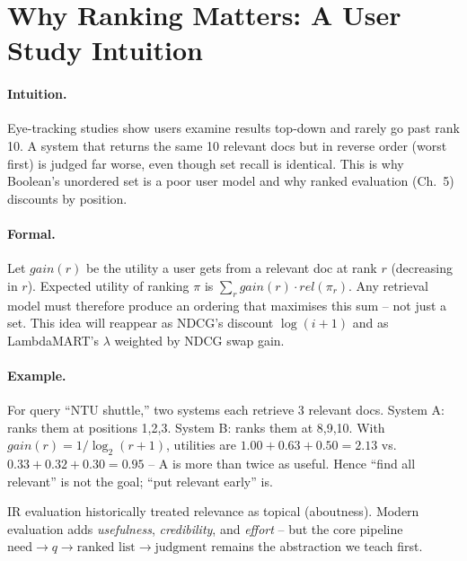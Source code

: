 
\section{Why Ranking Matters: A User Study Intuition}\label{sec:ranking-intuition}
\paragraph{Intuition.} Eye-tracking studies show users examine results top-down and rarely go past rank 10. A system that returns the same 10 relevant docs but in reverse order (worst first) is judged far worse, even though set recall is identical. This is why Boolean's unordered set is a poor user model and why ranked evaluation (Ch.~5) discounts by position.

\paragraph{Formal.} Let $gain(r)$ be the utility a user gets from a relevant doc at rank $r$ (decreasing in $r$). Expected utility of ranking $\pi$ is $\sum_r gain(r)\cdot rel(\pi_r)$. Any retrieval model must therefore produce an ordering that maximises this sum -- not just a set. This idea will reappear as NDCG's discount $\log(i+1)$ and as LambdaMART's $\lambda$ weighted by NDCG swap gain.

\paragraph{Example.} For query ``NTU shuttle,'' two systems each retrieve 3 relevant docs. System A: ranks them at positions 1,2,3. System B: ranks them at 8,9,10. With $gain(r)=1/\log_2(r+1)$, utilities are $1.00+0.63+0.50=2.13$ vs.\ $0.33+0.32+0.30=0.95$ -- A is more than twice as useful. Hence ``find all relevant'' is not the goal; ``put relevant early'' is.

\begin{remark}
IR evaluation historically treated relevance as topical (aboutness). Modern evaluation adds \emph{usefulness}, \emph{credibility}, and \emph{effort} -- but the core pipeline $\text{need}\to q\to\text{ranked list}\to\text{judgment}$ remains the abstraction we teach first.
\end{remark}


